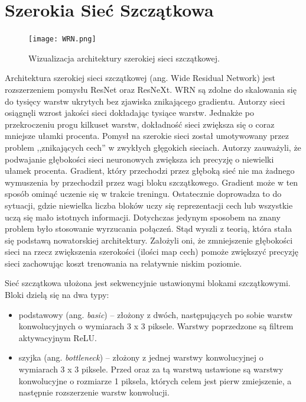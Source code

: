 \documentclass[12pt,a4paper,twoside,titlepage,openright]{book}
\begin{document}
\cite{DBLP:journals/corr/abs-1805-08700}


\section{Szerokia Sieć Szczątkowa}
\begin{figure}[ht]
 	\centering
 			\texttt{[image: WRN.png]}
 		\caption{Wizualizacja architektury szerokiej sieci szczątkowej.}
 \end{figure}

Architektura szerokiej sieci szczątkowej (ang. Wide Residual Network) jest rozszerzeniem pomysłu ResNet oraz ResNeXt. WRN są zdolne do skalowania się do tysięcy warstw ukrytych bez zjawiska znikającego gradientu. Autorzy sieci osiągnęli wzrost jakości sieci dokładając tysiące warstw. Jednakże po przekroczeniu progu kilkuset warstw, dokładność sieci zwiększa się o coraz mniejsze ułamki procenta. Pomysł na szerokie sieci został umotywowany przez problem ,,znikających cech'' w zwykłych głęgokich sieciach. Autorzy zauważyli, że podwajanie głębokości sieci neuronowych zwiększa ich precyzję o niewielki ułamek procenta. Gradient, który przechodzi przez głęboką sieć nie ma żadnego wymuszenia by przechodził przez wagi bloku szczątkowego. Gradient może w ten sposób ominąć uczenie się w trakcie treningu. Ostatecznie doprowadza to do sytuacji, gdzie niewielka liczba bloków uczy się reprezentacji cech lub wszystkie uczą się mało istotnych informacji. Dotychczas jedynym sposobem na znany problem było stosowanie wyrzucania połączeń. Stąd wyszli z teorią, która stała się podstawą nowatorskiej architektury. Założyli oni, że zmniejszenie głębokości sieci na rzecz zwiększenia szerokości (ilości map cech) pomoże zwiększyć precyzję sieci zachowując koszt trenowania na relatywnie niskim poziomie.

Sieć szczątkowa ułożona jest sekwencyjnie ustawionymi blokami szczątkowymi. Bloki dzielą się na dwa typy:
\begin{itemize}
\item podstawowy (ang. \textit{basic}) -- złożony z dwóch, następujących po sobie warstw konwolucyjnych o wymiarach 3 x 3 piksele. Warstwy poprzedzone są filtrem aktywacyjnym ReLU.
\item szyjka (ang. \textit{bottleneck}) -- złożony z jednej warstwy konwolucyjnej o wymiarach 3 x 3 piksele. Przed oraz za tą warstwą ustawione są warstwy konwolucyjne o rozmiarze 1 piksela, których celem jest pierw zmiejszenie, a następnie rozszerzenie warstw konwolucji. 
\end{itemize}
\end{document}
